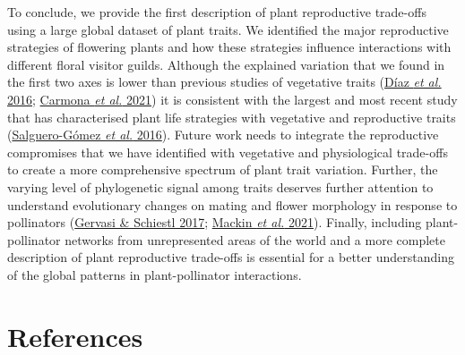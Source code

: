 \documentclass[
  12pt,
  a4paper,
]{article}
\begin{document}
To conclude, we provide the first description of plant reproductive trade-offs using a large global dataset of plant traits. We identified the major reproductive strategies of flowering plants and how these strategies influence interactions with different floral visitor guilds. Although the explained variation that we found in the first two axes is lower than previous studies of vegetative traits (\protect\hyperlink{ref-diaz2016}{Díaz \emph{et al.} 2016}; \protect\hyperlink{ref-carmona2021}{Carmona \emph{et al.} 2021}) it is consistent with the largest and most recent study that has characterised plant life strategies with vegetative and reproductive traits (\protect\hyperlink{ref-salguero2016}{Salguero-Gómez \emph{et al.} 2016}). Future work needs to integrate the reproductive compromises that we have identified with vegetative and physiological trade-offs to create a more comprehensive spectrum of plant trait variation. Further, the varying level of phylogenetic signal among traits deserves further attention to understand evolutionary changes on mating and flower morphology in response to pollinators (\protect\hyperlink{ref-gervasi2017}{Gervasi \& Schiestl 2017}; \protect\hyperlink{ref-mackin2021}{Mackin \emph{et al.} 2021}). Finally, including plant-pollinator networks from unrepresented areas of the world and a more complete description of plant reproductive trade-offs is essential for a better understanding of the global patterns in plant-pollinator interactions.

\hypertarget{references}{%
\section{References}\label{references}}
\end{document}

